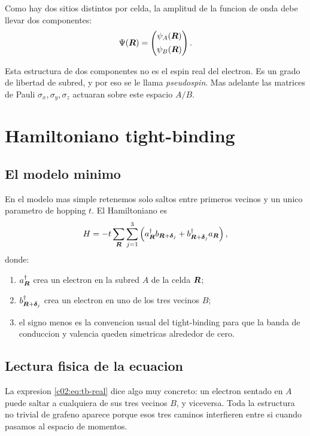 Como hay dos sitios distintos por celda, la amplitud de la funcion de onda debe llevar dos componentes:
\begin{equation}
\Psi(\bm{R}) =
\begin{pmatrix}
\psi_A(\bm{R})\\[4pt]
\psi_B(\bm{R})
\end{pmatrix}.
\end{equation}

Esta estructura de dos componentes no es el espin real del electron. Es un grado de libertad de subred, y por eso se le llama \textit{pseudospin}. Mas adelante las matrices de Pauli \(\sigma_x,\sigma_y,\sigma_z\) actuaran sobre este espacio \(A/B\).

\section{Hamiltoniano tight-binding}

\subsection{El modelo minimo}

En el modelo mas simple retenemos solo saltos entre primeros vecinos y un unico parametro de hopping \(t\). El Hamiltoniano es
\begin{equation}
H = -t \sum_{\bm{R}}\sum_{j=1}^3
\left(
a_{\bm{R}}^\dagger b_{\bm{R}+\bm{\delta}_j}
+ b_{\bm{R}+\bm{\delta}_j}^\dagger a_{\bm{R}}
\right),
\label{c02:eq:tb-real}
\end{equation}
donde:

\begin{enumerate}[leftmargin=*]
  \item \(a_{\bm{R}}^\dagger\) crea un electron en la subred \(A\) de la celda \(\bm{R}\);
  \item \(b_{\bm{R}+\bm{\delta}_j}^\dagger\) crea un electron en uno de los tres vecinos \(B\);
  \item el signo menos es la convencion usual del tight-binding para que la banda de conduccion y valencia queden simetricas alrededor de cero.
\end{enumerate}

\subsection{Lectura fisica de la ecuacion}

La expresion \eqref{c02:eq:tb-real} dice algo muy concreto: un electron sentado en \(A\) puede saltar a cualquiera de sus tres vecinos \(B\), y viceversa. Toda la estructura no trivial de grafeno aparece porque esos tres caminos interfieren entre si cuando pasamos al espacio de momentos.

